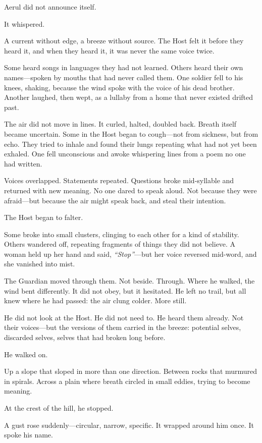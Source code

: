 \documentclass[12pt]{article}
\begin{document}
Aerul did not announce itself.

It whispered.

A current without edge, a breeze without source. The Host felt it before they heard it, and when they heard it, it was never the same voice twice.

Some heard songs in languages they had not learned. Others heard their own names—spoken by mouths that had never called them. One soldier fell to his knees, shaking, because the wind spoke with the voice of his dead brother. Another laughed, then wept, as a lullaby from a home that never existed drifted past.

The air did not move in lines. It curled, halted, doubled back. Breath itself became uncertain. Some in the Host began to cough—not from sickness, but from echo. They tried to inhale and found their lungs repeating what had not yet been exhaled. One fell unconscious and awoke whispering lines from a poem no one had written.

Voices overlapped. Statements repeated. Questions broke mid-syllable and returned with new meaning. No one dared to speak aloud. Not because they were afraid—but because the air might speak back, and steal their intention.

The Host began to falter.

Some broke into small clusters, clinging to each other for a kind of stability. Others wandered off, repeating fragments of things they did not believe. A woman held up her hand and said, \textit{``Stop''}—but her voice reversed mid-word, and she vanished into mist.

The Guardian moved through them. Not beside. Through. Where he walked, the wind bent differently. It did not obey, but it hesitated. He left no trail, but all knew where he had passed: the air clung colder. More still.

He did not look at the Host. He did not need to. He heard them already. Not their voices—but the versions of them carried in the breeze: potential selves, discarded selves, selves that had broken long before.

He walked on.

Up a slope that sloped in more than one direction. Between rocks that murmured in spirals. Across a plain where breath circled in small eddies, trying to become meaning.

At the crest of the hill, he stopped.

A gust rose suddenly—circular, narrow, specific. It wrapped around him once. It spoke his name.
\end{document}
